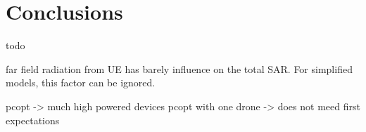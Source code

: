 \chapter{Conclusions}
\label{chap:conclusions}

todo

far field radiation from UE has barely influence on the total SAR. For simplified models, this factor can be ignored.

pcopt -> much high powered devices
pcopt with one drone -> does not meed first expectations
